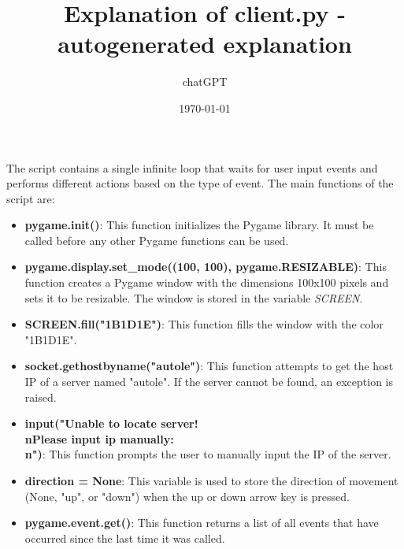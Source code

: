 \documentclass{article}
\title{Explanation of client.py - autogenerated explanation}
\author{chatGPT}
\date{\today}
\begin{document}
\maketitle
The script contains a single infinite loop that waits for user input events and performs different actions based on the type of event. The main functions of the script are:

\begin{itemize}
    \item \textbf{pygame.init()}: This function initializes the Pygame library. It must be called before any other Pygame functions can be used.
    \item \textbf{pygame.display.set\_mode((100, 100), pygame.RESIZABLE)}: This function creates a Pygame window with the dimensions 100x100 pixels and sets it to be resizable. The window is stored in the variable \textit{SCREEN}.
    \item \textbf{SCREEN.fill("1B1D1E")}: This function fills the window with the color "1B1D1E".
    \item \textbf{socket.gethostbyname("autole")}: This function attempts to get the host IP of a server named "autole". If the server cannot be found, an exception is raised.
    \item \textbf{input("Unable to locate server!\\nPlease input ip manually:\\n")}: This function prompts the user to manually input the IP of the server.
    \item \textbf{direction = None}: This variable is used to store the direction of movement (None, "up", or "down") when the up or down arrow key is pressed.
    \item \textbf{pygame.event.get()}: This function returns a list of all events that have occurred since the last time it was called.
\end{itemize}
\end{document}
